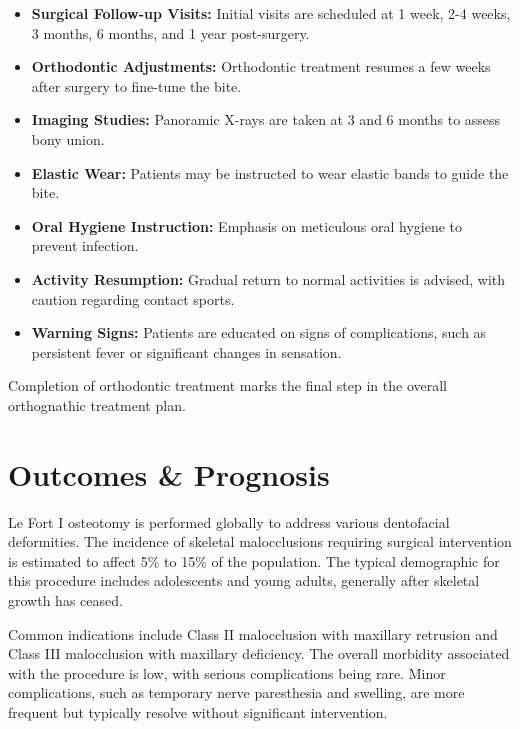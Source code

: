 \begin{itemize}
  \item \textbf{Surgical Follow-up Visits:} Initial visits are scheduled at 1 week, 2-4 weeks, 3 months, 6 months, and 1 year post-surgery.
  
  \item \textbf{Orthodontic Adjustments:} Orthodontic treatment resumes a few weeks after surgery to fine-tune the bite.
  
  \item \textbf{Imaging Studies:} Panoramic X-rays are taken at 3 and 6 months to assess bony union.
  
  \item \textbf{Elastic Wear:} Patients may be instructed to wear elastic bands to guide the bite.
  
  \item \textbf{Oral Hygiene Instruction:} Emphasis on meticulous oral hygiene to prevent infection.
  
  \item \textbf{Activity Resumption:} Gradual return to normal activities is advised, with caution regarding contact sports.
  
  \item \textbf{Warning Signs:} Patients are educated on signs of complications, such as persistent fever or significant changes in sensation.
\end{itemize}

Completion of orthodontic treatment marks the final step in the overall orthognathic treatment plan.

\section*{Outcomes \& Prognosis}
Le Fort I osteotomy is performed globally to address various dentofacial deformities. The incidence of skeletal malocclusions requiring surgical intervention is estimated to affect 5\% to 15\% of the population. The typical demographic for this procedure includes adolescents and young adults, generally after skeletal growth has ceased. 

Common indications include Class II malocclusion with maxillary retrusion and Class III malocclusion with maxillary deficiency. The overall morbidity associated with the procedure is low, with serious complications being rare. Minor complications, such as temporary nerve paresthesia and swelling, are more frequent but typically resolve without significant intervention.

